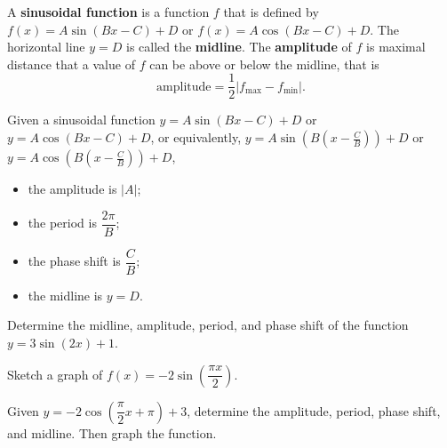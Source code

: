 \begin{definition}
  A \textbf{sinusoidal function} is a function $f$ that is defined by
  $f(x)=A\sin(Bx-C)+D$ or $f(x)=A\cos(Bx-C)+D$. The horizontal line $y=D$ is called the \textbf{midline}. The \textbf{amplitude} of $f$ is maximal distance that a value of $f$ can be above or below the midline, that is 
  \[\text{amplitude}=\frac{1}{2}|f_{\max}-f_{\min}|.\]
\end{definition}

\begin{howto}
  Given a sinusoidal function $y=A\sin(Bx-C)+D$ or $y=A\cos(Bx-C)+D$, or equivalently, $y=A\sin(B(x-\frac{C}{B}))+D$ or $y=A\cos(B(x-\frac{C}{B}))+D$, 
  \begin{itemize}
    \item the amplitude is $|A|$;
    \item the period is $\dfrac{2\pi}{B}$;
    \item the phase shift is $\dfrac{C}{B}$;
    \item the midline is $y=D$.
  \end{itemize}
\end{howto}

\newpage

\begin{example}
  Determine the midline, amplitude, period, and phase shift of the function $y=3\sin (2x)+1$.
\end{example}

\begin{example}
  Sketch a graph of $f(x)=-2\sin\left(\dfrac{\pi x}{2}\right)$.
\end{example}

\newpage

\begin{example}
  Given $y=-2\cos\left(\dfrac{\pi}{2}x+\pi\right)+3$, determine the amplitude, period, phase shift, and midline. Then graph the function.
\end{example}

